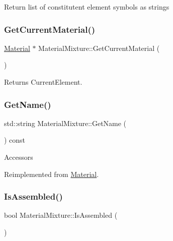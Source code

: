 Return list of constitutent element symbols as strings \mbox{\label{classMaterialMixture_a79fdfceeff97e4df6ddf90bbaecea148}} 
\subsubsection{\texorpdfstring{Get\+Current\+Material()}{GetCurrentMaterial()}}
{\footnotesize\ttfamily \hyperlink{classMaterial}{Material} $\ast$ Material\+Mixture\+::\+Get\+Current\+Material (\begin{DoxyParamCaption}{ }\end{DoxyParamCaption})}

Returns Current\+Element. \mbox{\label{classMaterialMixture_a6be94c93c7018961429d044aef451f8b}} 
\subsubsection{\texorpdfstring{Get\+Name()}{GetName()}}
{\footnotesize\ttfamily std\+::string Material\+Mixture\+::\+Get\+Name (\begin{DoxyParamCaption}{ }\end{DoxyParamCaption}) const\hspace{0.3cm}{\ttfamily [virtual]}}

Accessors 

Reimplemented from \hyperlink{classMaterial}{Material}.

\mbox{\label{classMaterialMixture_a859435679b11be52ab5b92bfacb95d17}} 
\subsubsection{\texorpdfstring{Is\+Assembled()}{IsAssembled()}}
{\footnotesize\ttfamily bool Material\+Mixture\+::\+Is\+Assembled (\begin{DoxyParamCaption}{ }\end{DoxyParamCaption})}

